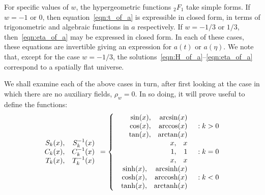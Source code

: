 For specific values of $w$, the hypergeometric functions $_2F_1$ take simple forms. If $w=-1$ or $0$, then equation~\eqref{eqn:t_of_a} is expressible in closed form, in terms of trigonometric and algebraic functions in $a$ respectively. If $w=-1/3$ or $1/3$, then~\eqref{eqn:eta_of_a} may be expressed in closed form. In each of these cases, these equations are invertible giving an expression for $a(t)$ or $a(\eta)$.  We note that, except for the case $w=-1/3$, the solutions~\eqref{eqn:H_of_a}--\eqref{eqn:eta_of_a} correspond to a spatially flat universe.

We shall examine each of the above cases in turn, after first looking at the case in which there are no auxiliary fields, $\rho_w=0$.  In so doing, it will prove useful to define the functions:
%
\begin{equation}
  \begin{array}{rr}
    S_k(x),&S_k^{-1}(x)
    \\ 
    C_k(x),&C_k^{-1}(x)
    \\ 
    T_k(x),&T_k^{-1}(x)
    \\
  \end{array}
  =
  \left\{
%
  \begin{array}{rl}
%
    \begin{array}{rr}
      \sin(x),&\arcsin(x)
      \\ 
      \cos(x),&\arccos(x)
      \\ 
      \tan(x),&\arctan(x)
      \\
    \end{array}
%
    &: k>0 \\
%
    \begin{array}{rr}
      x,&x
      \\ 
      1,&1
      \\ 
      x,&x
      \\
    \end{array}
%
    &: k=0 \\
%
    \begin{array}{rr}
      \sinh(x),&\arcsinh(x)
      \\ 
      \cosh(x),&\arccosh(x)
      \\ 
      \tanh(x),&\arctanh(x)
      \\
    \end{array}
%
    &: k<0
  \end{array}
%
  \right. 
\end{equation}
%

